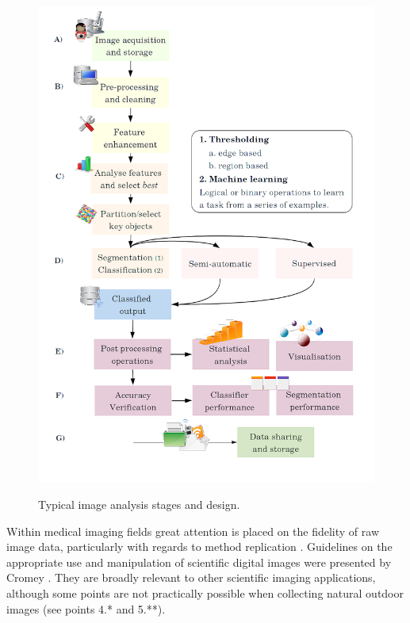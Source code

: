 \begin{figure}[!htbp] \myfloatalign
\includegraphics[width=1\linewidth]{gfx3/imagea_stages1}\\
\caption[Typical image analysis stages and design.]{Typical image analysis stages and design.}\label{fig:general-stages}
\end{figure}

Within medical imaging fields great attention is placed on the fidelity of raw image data, particularly with regards to method replication \cite{Pearson2007}. Guidelines on the appropriate use and manipulation of scientific digital images were presented by Cromey \cite{Cromey2010}. They are broadly relevant to other scientific imaging applications, although some points are not practically possible when collecting natural outdoor images (see points 4.* and 5.**).


